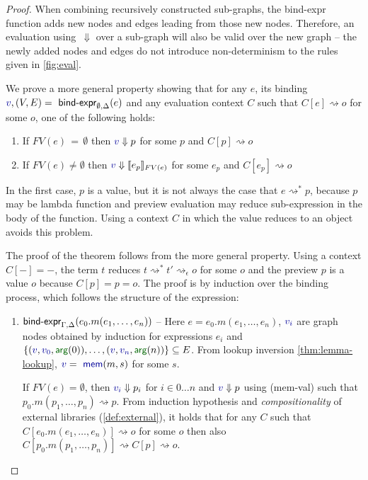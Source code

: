 \documentclass[english,crc,references=cleveref]{programming}
\theoremstyle{plain}
\theoremstyle{definition}
\newcommand{\ident}[1]{\textnormal{\textcolor{idclr}{\sffamily #1}}}
\newcommand{\bndclr}[1]{\textcolor{kvdclr}{#1}}
\newcommand{\bnd}[1]{\textnormal{\textcolor{kvdclr}{\sffamily #1}}}
\newcommand{\blbl}[1]{\textnormal{\textcolor{numclr}{\sffamily #1}}}
\newcommand{\rname}[1]{{\sffamily(#1)}}
\begin{document}
\begin{proof}
When combining recursively constructed sub-graphs, the \ident{bind-expr} function
adds new nodes and edges leading from those new nodes. Therefore, an evaluation using~$\Downarrow$
over a sub-graph will also be valid over the new graph -- the newly added nodes and edges do not introduce
non-determinism to the rules given in \cref{fig:eval}.

We prove a more general property showing that for any $e$, its binding
$\bndclr{v}, (V, E) = \ident{bind-expr}_{\emptyset, \Delta}(e)$ and any evaluation context $C$
such that $C[e]\rightsquigarrow o$ for some $o$, one of the following holds:
%
\begin{enumerate}
  \renewcommand{\theenumi}{\alph{enumi}}%
\item If $FV(e)\,=\,\emptyset$ then $\bndclr{v} \Downarrow p$ for some $p$ and $C[p] \rightsquigarrow o$
\item If $FV(e)\neq\emptyset$ then $\bndclr{v} \Downarrow \llbracket e_p \rrbracket_{FV(e)}$ for some $e_p$ and $C[e_p] \rightsquigarrow o$
\end{enumerate}
%
In the first case, $p$ is a value, but it is not always the case that $e \rightsquigarrow^{*} p$,
because $p$ may be lambda function and preview evaluation may reduce sub-expression in the body of
the function. Using a context $C$ in which the value reduces to an object avoids this problem.

The proof of the theorem follows from the more general property. Using a context $C[-]=-$, the
term $t$ reduces $t \rightsquigarrow^{*}t' \rightsquigarrow_\epsilon o$ for some $o$ and the
preview $p$ is a value $o$ because $C[p] = p = o$.
The proof is by induction over the binding process, which follows the structure of the expression:

\begin{enumerate}
  \renewcommand*\labelenumi{\usekomafont{listlabel}\theenumi}
  \renewcommand{\theenumi}{(\arabic{enumi})}%

\item \label{itm:1} $\ident{bind-expr}_{\Gamma, \Delta}(e_0.m(e_1, \ldots, e_n))$ --
  Here $e = e_0.m(e_1, \ldots, e_n)$, $\bndclr{v_i}$ are graph nodes obtained by induction for
  expressions $e_i$ and $\{ (\bndclr{v}, \bndclr{v_0}, \blbl{arg}(0)), \ldots, (\bndclr{v}, \bndclr{v_n}, \blbl{arg}(n))\} \subseteq E$.
  From lookup inversion \cref{thm:lemma-lookup}, $\bndclr{v} = \bnd{mem}(m, s)$ for some $s$.

  If $FV(e)=\emptyset$, then $\bndclr{v_i} \Downarrow p_i$ for $i\in 0\ldots n$ and
  $\bndclr{v}\Downarrow p$ using \rname{mem-val} such that $p_0.m(p_1, \ldots, p_n) \rightsquigarrow p$.
  From induction hypothesis and \emph{compositionality} of external libraries (\cref{def:external}),
  it holds that for any $C$ such that $C[e_0.m(e_1, \ldots, e_n)] \rightsquigarrow o$ for some $o$
  then also $C[p_0.m(p_1, \ldots, p_n)] \rightsquigarrow C[p] \rightsquigarrow o$.


\end{enumerate}
\end{proof}
\end{document}
